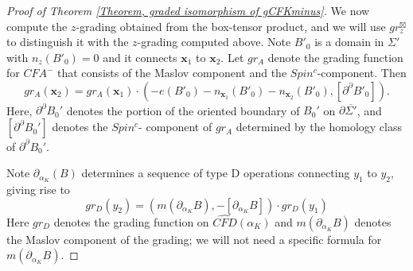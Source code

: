 \documentclass{amsart}
\theoremstyle{definition}
\theoremstyle{remark}
\numberwithin{equation}{section}
\numberwithin{equation}{section} \makeatletter
\begin{document}
\begin{proof}[Proof of Theorem \ref{Theorem, graded isomorphism of gCFKminus}]
We now compute the $z$-grading obtained from the box-tensor product, and we will use $gr_z^{\boxtimes}$ to distinguish it with the $z$-grading computed above. Note $B'_0$ is a domain in $\Sigma'$ with $n_z(B'_0)=0$ and it connects $\bm{x}_1$ to $\bm{x}_2$. Let $gr_A$ denote the grading function for $CFA^-$ that consists of the Maslov component and the $Spin^c$-component. Then 
$$
gr_A(\bm{x}_2)=gr_A(\bm{x}_1)\cdot(-e(B'_0)-n_{\bm{x}_1}(B'_0)-n_{\bm{x}_2}(B'_0),[\partial^\partial B'_0]).
$$
Here, $\partial^\partial B_0'$ denotes the portion of the oriented boundary of $B_0'$ on $\partial \overline{\Sigma'}$, and $[\partial^\partial B_0']$ denotes the $Spin^c$- component of $gr_A$ determined by the homology class of $\partial^\partial B_0'$. 

Note $\partial_{\alpha_K}(B)$ determines a sequence of type D operations connecting $y_1$ to $y_2$, giving rise to 
$$
gr_D(y_2)=(m(\partial_{\alpha_{K}}B),-[\partial_{\alpha_{K}}B])\cdot gr_D(y_1)
$$
Here $gr_D$ denotes the grading function on $\widehat{CFD}(\alpha_{K})$ and $m(\partial_{\alpha_{K}}B)$ denotes the Maslov component of the grading; we will not need a specific formula for $m(\partial_{\alpha_{K}}B)$.


\end{proof}
\end{document}
